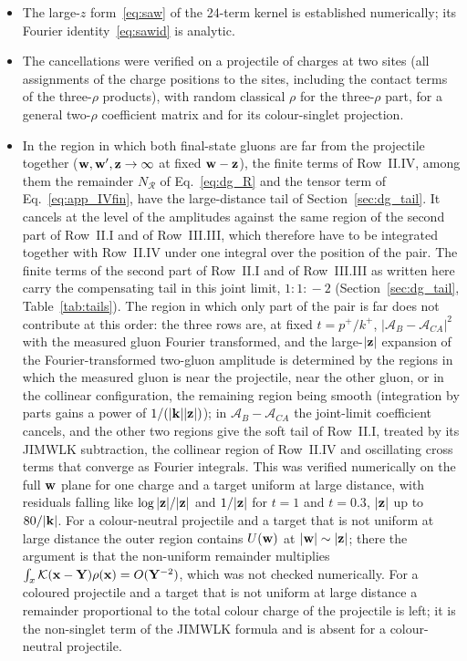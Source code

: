 \begin{itemize}
\item[(C8)] The large-$z$ form~\eqref{eq:saw} of the 24-term kernel is established numerically; its Fourier identity~\eqref{eq:sawid} is analytic.
\item[(C9)] The cancellations were verified on a projectile of charges at two sites (all assignments of the charge positions to the sites, including the contact terms of the three-$\rho$ products), with random classical $\rho$ for the three-$\rho$ part, for a general two-$\rho$ coefficient matrix and for its colour-singlet projection.
\item[(C10)] In the region in which both final-state gluons are far from the projectile together ($\mathbf{w},\mathbf{w}',\mathbf{z}\to\infty$ at fixed $\mathbf{w}-\mathbf{z}$), the finite terms of Row~II.IV, among them the remainder $N_{\mathcal R}$ of Eq.~\eqref{eq:dg_R} and the tensor term of Eq.~\eqref{eq:app_IVfin}, have the large-distance tail of Section~\ref{sec:dg_tail}. It cancels at the level of the amplitudes against the same region of the second part of Row~II.I and of Row~III.III, which therefore have to be integrated together with Row~II.IV under one integral over the position of the pair. The finite terms of the second part of Row~II.I and of Row~III.III as written here carry the compensating tail in this joint limit, $1\!:\!1\!:\!-2$ (Section~\ref{sec:dg_tail}, Table~\ref{tab:tails}). The region in which only part of the pair is far does not contribute at this order: the three rows are, at fixed $t=p^+/k^+$, $|\mathcal A_B-\mathcal A_{CA}|^2$ with the measured gluon Fourier transformed, and the large-$|\mathbf{z}|$ expansion of the Fourier-transformed two-gluon amplitude is determined by the regions in which the measured gluon is near the projectile, near the other gluon, or in the collinear configuration, the remaining region being smooth (integration by parts gains a power of $1/(|\mathbf{k}||\mathbf{z}|)$); in $\mathcal A_B-\mathcal A_{CA}$ the joint-limit coefficient cancels, and the other two regions give the soft tail of Row~II.I, treated by its JIMWLK subtraction, the collinear region of Row~II.IV and oscillating cross terms that converge as Fourier integrals. This was verified numerically on the full $\mathbf{w}$ plane for one charge and a target uniform at large distance, with residuals falling like $\log|\mathbf{z}|/|\mathbf{z}|$ and $1/|\mathbf{z}|$ for $t=1$ and $t=0.3$, $|\mathbf{z}|$ up to $80/|\mathbf{k}|$. For a colour-neutral projectile and a target that is not uniform at large distance the outer region contains $U(\mathbf{w})$ at $|\mathbf{w}|\sim|\mathbf{z}|$; there the argument is that the non-uniform remainder multiplies $\int_x\mathcal{K}(\mathbf{x}-\mathbf{Y})\rho(\mathbf{x})=O(\mathbf{Y}^{-2})$, which was not checked numerically. For a coloured projectile and a target that is not uniform at large distance a remainder proportional to the total colour charge of the projectile is left; it is the non-singlet term of the JIMWLK formula and is absent for a colour-neutral projectile.
\end{itemize}
